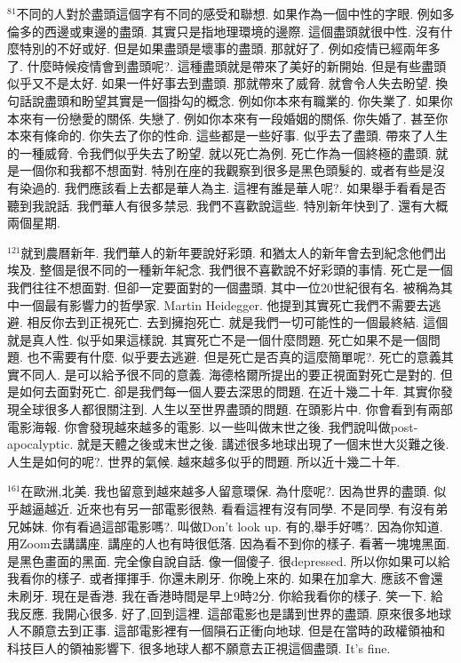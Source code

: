 \documentclass{book}
\begin{document}
$^{81}$不同的人對於盡頭這個字有不同的感受和聯想.
如果作為一個中性的字眼.
例如多倫多的西邊或東邊的盡頭.
其實只是指地理環境的邊際.
這個盡頭就很中性.
沒有什麼特別的不好或好.
但是如果盡頭是壞事的盡頭.
那就好了.
例如疫情已經兩年多了.
什麼時候疫情會到盡頭呢?.
這種盡頭就是帶來了美好的新開始.
但是有些盡頭似乎又不是太好.
如果一件好事去到盡頭.
那就帶來了威脅.
就會令人失去盼望.
換句話說盡頭和盼望其實是一個掛勾的概念.
例如你本來有職業的.
你失業了.
如果你本來有一份戀愛的關係.
失戀了.
例如你本來有一段婚姻的關係.
你失婚了.
甚至你本來有條命的.
你失去了你的性命.
這些都是一些好事.
似乎去了盡頭.
帶來了人生的一種威脅.
令我們似乎失去了盼望.
就以死亡為例.
死亡作為一個終極的盡頭.
就是一個你和我都不想面對.
特別在座的我觀察到很多是黑色頭髮的.
或者有些是沒有染過的.
我們應該看上去都是華人為主.
這裡有誰是華人呢?.
如果舉手看看是否聽到我說話.
我們華人有很多禁忌.
我們不喜歡說這些.
特別新年快到了.
還有大概兩個星期.

$^{121}$就到農曆新年.
我們華人的新年要說好彩頭.
和猶太人的新年會去到紀念他們出埃及.
整個是很不同的一種新年紀念.
我們很不喜歡說不好彩頭的事情.
死亡是一個我們往往不想面對.
但卻一定要面對的一個盡頭.
其中一位20世紀很有名.
被稱為其中一個最有影響力的哲學家.
Martin Heidegger.
他提到其實死亡我們不需要去逃避.
相反你去到正視死亡.
去到擁抱死亡.
就是我們一切可能性的一個最終結.
這個就是真人性.
似乎如果這樣說.
其實死亡不是一個什麼問題.
死亡如果不是一個問題.
也不需要有什麼.
似乎要去逃避.
但是死亡是否真的這麼簡單呢?.
死亡的意義其實不同人.
是可以給予很不同的意義.
海德格爾所提出的要正視面對死亡是對的.
但是如何去面對死亡.
卻是我們每一個人要去深思的問題.
在近十幾二十年.
其實你發現全球很多人都很關注到.
人生以至世界盡頭的問題.
在頭影片中.
你會看到有兩部電影海報.
你會發現越來越多的電影.
以一些叫做末世之後.
我們說叫做post-apocalyptic.
就是天體之後或末世之後.
講述很多地球出現了一個末世大災難之後.
人生是如何的呢?.
世界的氣候.
越來越多似乎的問題.
所以近十幾二十年.

$^{161}$在歐洲,北美.
我也留意到越來越多人留意環保.
為什麼呢?.
因為世界的盡頭.
似乎越逼越近.
近來也有另一部電影很熱.
看看這裡有沒有同學.
不是同學.
有沒有弟兄姊妹.
你有看過這部電影嗎?.
叫做Don't look up.
有的,舉手好嗎?.
因為你知道.
用Zoom去講講座.
講座的人也有時很低落.
因為看不到你的樣子.
看著一塊塊黑面.
是黑色畫面的黑面.
完全像自說自話.
像一個傻子.
很depressed.
所以你如果可以給我看你的樣子.
或者揮揮手.
你還未刷牙.
你晚上來的.
如果在加拿大.
應該不會還未刷牙.
現在是香港.
我在香港時間是早上9時2分.
你給我看你的樣子.
笑一下.
給我反應.
我開心很多.
好了,回到這裡.
這部電影也是講到世界的盡頭.
原來很多地球人不願意去到正事.
這部電影裡有一個隕石正衝向地球.
但是在當時的政權領袖和科技巨人的領袖影響下.
很多地球人都不願意去正視這個盡頭.
It's fine.
\end{document}
